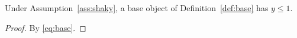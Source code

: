 
\begin{proposition}\label{prop:assumed}
Under Assumption~\ref{ass:shaky}, a base object of
Definition~\ref{def:base} has $y \le 1$.
\end{proposition}

\begin{proof}
By \eqref{eq:base}.
\end{proof}
